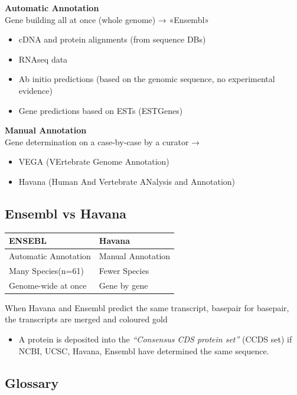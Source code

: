 \documentclass[11pt]{article}
\begin{document}
\textbf{Automatic Annotation}\\
Gene building all at once (whole genome) → «Ensembl»
\begin{itemize}
\item cDNA and protein alignments (from sequence DBs)
\item RNAseq data
\item Ab initio predictions (based on the genomic sequence, no experimental
evidence)
\item Gene predictions based on ESTs (ESTGenes)
\end{itemize}


\textbf{Manual Annotation}\\
Gene determination on a case-by-case by a curator →
\begin{itemize}
\item VEGA (VErtebrate Genome Annotation)
\item Havana (Human And Vertebrate ANalysis and Annotation)
\end{itemize}

\subsection{Ensembl vs Havana}
\label{sec:orgf21cce8}

\begin{center}
\begin{tabular}{ll}
ENSEBL & Havana\\
\hline
Automatic Annotation & Manual Annotation\\
Many Species(n=61) & Fewer Species\\
Genome-wide at once & Gene by gene\\
\end{tabular}
\end{center}


When Havana and Ensembl predict the same transcript, basepair for basepair, the
transcripts are merged and coloured gold


\begin{itemize}
\item A protein is deposited into the \emph{``Consensus CDS protein set''} (CCDS set) if
NCBI, UCSC, Havana, Ensembl have determined the same sequence.
\end{itemize}

\subsection{Glossary}
\label{sec:org8082b03}
\end{document}
